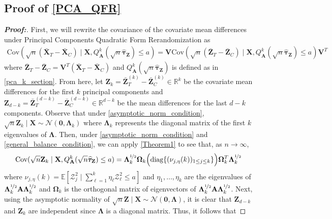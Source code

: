 \documentclass[11pt,twoside]{article}
\theoremstyle{definition}
\theoremstyle{remark}
\begin{document}
\subsection{Proof of \texorpdfstring{\cref{PCA_QFR}}{Theorem 7}} \label{PCA_QFR_proof}
\begin{proof}[\textbf{Proof:}]
First, we will rewrite the covariance of the covariate mean differences under Principal Components Quadratic Form Rerandomization as
\begin{align*}
    \text{Cov}(\sqrt{n}(\bar{\mathbf{X}}_T - \bar{\mathbf{X}}_C) \mid \mathbf{X}, Q^k_\mathbf{A}(\sqrt{n} \widehat{\bm{\tau}}_{\mathbf{Z}}) \leq a) = \mathbf{V}\text{Cov}(\sqrt{n}(\bar{\mathbf{Z}}_T - \bar{\mathbf{Z}}_C) \mid \mathbf{X}, Q^k_\mathbf{A}( \sqrt{n}\widehat{\bm{\tau}}_{\mathbf{Z}}) \leq a) \mathbf{V}^T
\end{align*}
where $\bar{\mathbf{Z}}_T - \bar{\mathbf{Z}}_C = \mathbf{V}^T(\bar{\mathbf{X}}_T - \bar{\mathbf{X}}_C)$ and $Q^k_\mathbf{A}(\sqrt{n}\widehat{\bm{\tau}}_{\mathbf{Z}})$ is defined as in \cref{pca_k_section}. From here, let $\mathbf{Z}_k = \bar{\mathbf{Z}}^{(k)}_T - \bar{\mathbf{Z}}^{(k)}_C \in \mathbb{R}^k$ be the covariate mean differences for the first $k$ principal components and $\mathbf{Z}_{d-k} = \bar{\mathbf{Z}}^{(d - k)}_T - \bar{\mathbf{Z}}^{(d - k)}_C \in \mathbb{R}^{d-k}$ be the mean differences for the last $d - k$ components. Observe that under \cref{asymptotic_norm_condition}, $\sqrt{n}\mathbf{Z}_k \mid \mathbf{X} \sim \mathcal{N}(\mathbf{0}, \mathbf{\Lambda}_k)$ where $\mathbf{\Lambda}_{k}$ represents the diagonal matrix of the first $k$ eigenvalues of $\mathbf{\Lambda}$. Then, under \cref{asymptotic_norm_condition} and \cref{general_balance_condition}, we can apply \cref{Theorem1} to see that, as $n \to \infty$,
\begin{align*}
    \text{Cov}(\sqrt{n} \mathbf{Z}_k \mid \mathbf{X}, Q^k_\mathbf{A}(\sqrt{n} \widehat{\bm{\tau}}_{\mathbf{Z}}) \leq a) &= \mathbf{\Lambda}^{\nicefrac{1}{2}}_k \mathbf{\Omega}_k \Big( \text{diag}\{(\nu_{j, \eta}(k))_{1 \leq j \leq k} \} \Big) \mathbf{\Omega}^T_k \mathbf{\Lambda}^{\nicefrac{1}{2}}_k
\end{align*}
where $\nu_{j,\eta}(k) = \mathbb{E}\left[\mathcal{Z}^2_j \mid  \sum^k_{\ell=1} \eta_\ell \mathcal{Z}^2_\ell \leq a \right]$ and $\eta_1, \ldots, \eta_k$ are the eigenvalues of $\mathbf{\Lambda}^{\nicefrac{1}{2}}_k \mathbf{A} \mathbf{\Lambda}^{\nicefrac{1}{2}}_k$ and $\mathbf{\Omega}_k$ is the orthogonal matrix of eigenvectors of $\mathbf{\Lambda}^{\nicefrac{1}{2}}_k \mathbf{A} \mathbf{\Lambda}^{\nicefrac{1}{2}}_k$. Next, using the asymptotic normality of $\sqrt{n}\mathbf{Z} \mid \mathbf{X} \sim \mathcal{N}(\mathbf{0}, \mathbf{\Lambda})$, it is clear that $\mathbf{Z}_{d-k}$ and $\mathbf{Z}_k$ are independent since $\mathbf{\Lambda}$ is a diagonal matrix. Thus, it follows that

\end{proof}
\end{document}
